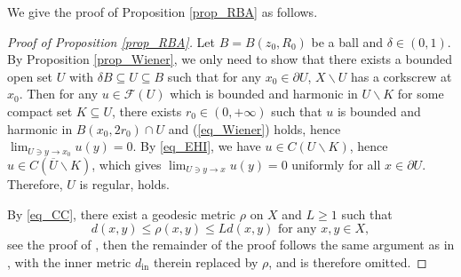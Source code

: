 \documentclass[11pt,a4paper]{article}
\numberwithin{equation}{section}
\theoremstyle{plain}
\theoremstyle{definition}
\begin{document}
We give the proof of Proposition \ref{prop_RBA} as follows.

\begin{proof}[Proof of Proposition \ref{prop_RBA}]
Let $B=B(z_0,R_0)$ be a ball and $\delta\in(0,1)$. By Proposition \ref{prop_Wiener}, we only need to show that there exists a bounded open set $U$ with $\delta B\subseteq U\subseteq B$ such that for any $x_0\in \partial U$, $X\backslash U$ has a corkscrew at $x_0$. Then for any $u\in \mathcal{F}(U)$ which is bounded and harmonic in $U\backslash K$ for some compact set $K\subseteq U$, there exists $r_0\in(0,+\infty)$ such that $u$ is bounded and harmonic in $B(x_0,2r_0)\cap U$ and (\ref{eq_Wiener}) holds, hence $\lim_{U\ni y\to x_0}u(y)=0$. By \ref{eq_EHI}, we have $u\in C(U\backslash K)$, hence $u\in C(\overline{U}\backslash K)$, which gives $\lim_{U\ni y\to x}u(y)=0$ uniformly for all $x\in \partial U$. Therefore, $U$ is regular, \hyperlink{eq_RBA}{} holds.

By \ref{eq_CC}, there exist a geodesic metric $\rho$ on $X$ and $L\ge1$ such that
$$d(x,y)\le \rho(x,y)\le Ld(x,y)\text{ for any }x,y\in X,$$
see the proof of \cite[PROPOSITION A.1 (a)$\Rightarrow$(b)]{KM20}, then the remainder of the proof follows the same argument as in \cite[Lemma 14.2]{BB11}, with the inner metric $d_{\mathrm{in}}$ therein replaced by $\rho$, and is therefore omitted.
\end{proof}


%
\end{document}
